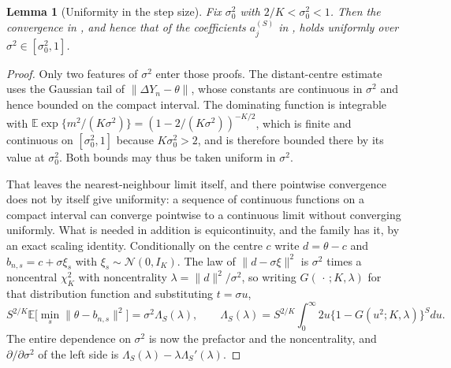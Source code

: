 \documentclass[11pt]{article}
\newtheorem{lemma}[lemma]{Lemma}
\theoremstyle{definition}
\newcommand{\E}{\mathbb{E}}
\newcommand{\Normal}{\mathcal{N}}
\begin{document}
\begin{lemma}[Uniformity in the step size]\label{lem:sigma_uniform}
Fix $\sigma_0^2$ with $2/K<\sigma_0^2<1$. Then the convergence in , and hence that of the coefficients $a_j^{(S)}$ in , holds uniformly over $\sigma^2\in[\sigma_0^2,1]$.
\end{lemma}

\begin{proof}
Only two features of $\sigma^2$ enter those proofs. The distant-centre estimate uses the Gaussian tail of $\lVert\Delta Y_n-\theta\rVert$, whose constants are continuous in $\sigma^2$ and hence bounded on the compact interval. The dominating function is integrable with $\E\exp\{m^2/(K\sigma^2)\}=(1-2/(K\sigma^2))^{-K/2}$, which is finite and continuous on $[\sigma_0^2,1]$ because $K\sigma_0^2>2$, and is therefore bounded there by its value at $\sigma_0^2$. Both bounds may thus be taken uniform in $\sigma^2$.

That leaves the nearest-neighbour limit itself, and there pointwise convergence does not by itself give uniformity: a sequence of continuous functions on a compact interval can converge pointwise to a continuous limit without converging uniformly. What is needed in addition is equicontinuity, and the family has it, by an exact scaling identity. Conditionally on the centre $c$ write $d=\theta-c$ and $b_{n,s}=c+\sigma\xi_s$ with $\xi_s\sim\Normal(0,I_K)$. The law of $\lVert d-\sigma\xi\rVert^2$ is $\sigma^2$ times a noncentral $\chi^2_K$ with noncentrality $\lambda=\lVert d\rVert^2/\sigma^2$, so writing $G(\,\cdot\,;K,\lambda)$ for that distribution function and substituting $t=\sigma u$,
\begin{equation}\label{eq:sigma_scaling}
S^{2/K}\E\bigl[\min_s\lVert\theta-b_{n,s}\rVert^2\bigr]
=\sigma^2\Lambda_S(\lambda),
\qquad
\Lambda_S(\lambda)=S^{2/K}\!\int_0^\infty\!2u\bigl\{1-G(u^2;K,\lambda)\bigr\}^S du .
\end{equation}
The entire dependence on $\sigma^2$ is now the prefactor and the noncentrality, and $\partial/\partial\sigma^2$ of the left side is $\Lambda_S(\lambda)-\lambda\Lambda_S'(\lambda)$.


\end{proof}
\end{document}
